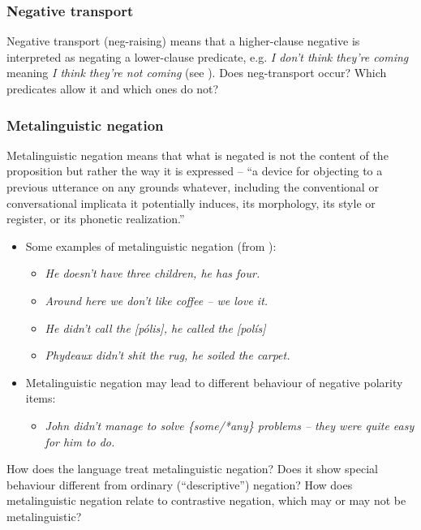 \documentclass[output=paper,colorlinks,citecolor=brown]{langscibook}
\begin{document}
\subsubsection{Negative transport}\label{sec:quest:4.6.1}

Negative transport (neg-raising) means that a higher-clause negative is interpreted as negating a lower-clause predicate, e.g. \textit{I don’t think they’re coming} meaning \textit{I think they’re not coming} (see \citealt{Horn1978,Horn1989}). Does neg-transport occur? Which predicates allow it and which ones do not?


\subsubsection{Metalinguistic negation}\label{sec:quest:4.6.2}

Metalinguistic negation means that what is negated is not the content of the proposition but rather the way it is expressed – “a device for objecting to a previous utterance on any grounds whatever, including the conventional or conversational implicata it potentially induces, its morphology, its style or register, or its phonetic realization.” \citep[363]{Horn1989} 

\begin{itemize}
    \item Some examples of metalinguistic negation (from \citealt{Horn1989}):
        \begin{itemize}
            \item \itshape He doesn’t have three children, he has four.
            \item \itshape Around here we don’t like coffee – we love it.
            \item \itshape He didn’t call the [pólis], he called the [polís]
            \item \itshape Phydeaux didn’t shit the rug, he soiled the carpet.
        \end{itemize}
    \item Metalinguistic negation may lead to different behaviour of negative polarity items:
        \begin{itemize}
            \item \textit{John didn’t manage to solve \{some/*any\} problems – they were quite easy for him to do.} \citep[130]{Horn1985}
        \end{itemize}
\end{itemize}

How does the language treat metalinguistic negation? Does it show special behaviour different from ordinary (“descriptive”) negation? How does metalinguistic negation relate to contrastive negation, which may or may not be metalinguistic?
\end{document}
